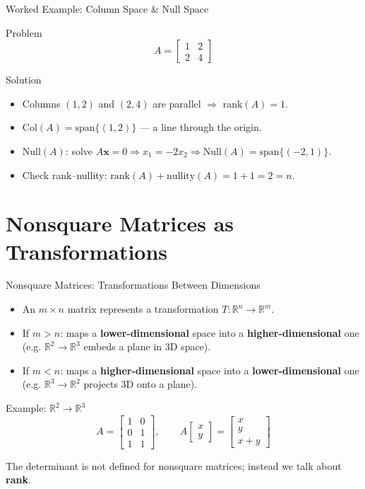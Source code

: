 \documentclass[9pt,aspectratio=169]{beamer}
\newcommand{\R}{\mathbb{R}}
\newcommand{\vect}[1]{\mathbf{#1}}
\begin{document}
\begin{frame}{Worked Example: Column Space \& Null Space}
\begin{exampleblock}{Problem}
$$A = \begin{bmatrix}1&2\\2&4\end{bmatrix}$$
\end{exampleblock}
\begin{block}{Solution}
\begin{itemize}
\item Columns $(1,2)$ and $(2,4)$ are parallel $\Rightarrow$ $\text{rank}(A)=1$.
\item $\text{Col}(A) = \text{span}\{(1,2)\}$ — a line through the origin.
\item $\text{Null}(A)$: solve $A\vect{x}=0 \Rightarrow x_1 = -2x_2 \Rightarrow \text{Null}(A) = \text{span}\{(-2,1)\}$.
\item Check rank–nullity: $\text{rank}(A) + \text{nullity}(A) = 1+1 = 2 = n$. \checkmark
\end{itemize}
\end{block}
\end{frame}

\section{Nonsquare Matrices as Transformations}

\begin{frame}{Nonsquare Matrices: Transformations Between Dimensions}
\begin{itemize}
\item An $m \times n$ matrix represents a transformation $T: \R^n \to \R^m$.
\item If $m > n$: maps a \textbf{lower-dimensional} space into a \textbf{higher-dimensional} one (e.g. $\R^2 \to \R^3$ embeds a plane in 3D space).
\item If $m < n$: maps a \textbf{higher-dimensional} space into a \textbf{lower-dimensional} one (e.g. $\R^3 \to \R^2$ projects 3D onto a plane).
\end{itemize}
\begin{exampleblock}{Example: $\R^2 \to \R^3$}
$$A = \begin{bmatrix}1&0\\0&1\\1&1\end{bmatrix}, \qquad A\begin{bmatrix}x\\y\end{bmatrix} = \begin{bmatrix}x\\y\\x+y\end{bmatrix}$$
\end{exampleblock}
The determinant is not defined for nonsquare matrices; instead we talk about \textbf{rank}.
\end{frame}
\end{document}
